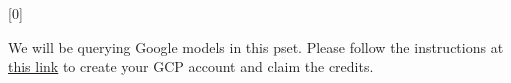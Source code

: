 [0]

We will be querying Google models in this pset. Please follow the instructions 
at \hyperlink{ https://docs.google.com/document/d/1yQMNQhIVDLeBC5jrCYRbRrjyDtYAieSEV96xH6aeZow/edit?usp=sharing}{this link} to create your GCP account 
and claim the credits.


\newpage


